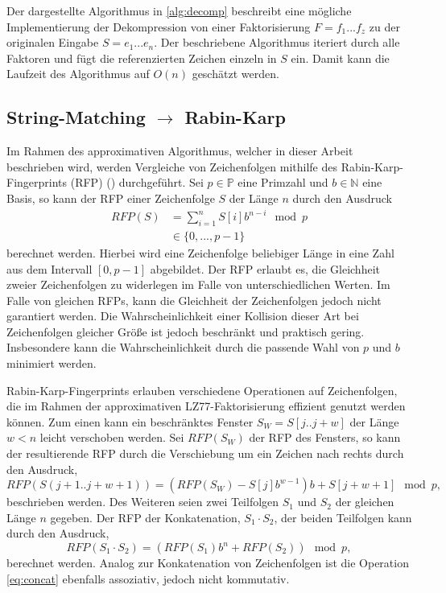 Der dargestellte Algorithmus in \ref{alg:decomp} beschreibt eine mögliche Implementierung der Dekompression von einer Faktorisierung $F=f_1...f_z$ zu der originalen Eingabe
$S=e_1...e_n$. Der beschriebene Algorithmus iteriert durch alle Faktoren und fügt die referenzierten Zeichen einzeln in $S$ ein. Damit kann die Laufzeit des 
Algorithmus auf $O(n)$ geschätzt werden.

\subsection{String-Matching $\rightarrow$ Rabin-Karp}
Im Rahmen des approximativen Algorithmus, welcher in dieser Arbeit beschrieben wird, werden Vergleiche von Zeichenfolgen mithilfe des Rabin-Karp-Fingerprints (RFP) (\cite{rfp})
durchgeführt. Sei
$p\in \mathbb{P}$ eine Primzahl und $b\in \mathbb{N}$ eine Basis, so kann der RFP einer Zeichenfolge $S$ der Länge $n$ durch den Ausdruck
\begin{equation}
    \begin{split}
    RFP(S) &= \sum_{i=1}^{n} S[i]b^{n-i} \mod p \\
    &\in \{0,...,p-1\}
    \end{split}
\end{equation}
berechnet werden. Hierbei wird eine Zeichenfolge beliebiger Länge in eine Zahl aus dem Intervall $[0,p-1]$ abgebildet. Der RFP erlaubt es, die Gleichheit zweier Zeichenfolgen zu widerlegen
im Falle von unterschiedlichen Werten. Im Falle von gleichen RFPs, kann die Gleichheit der Zeichenfolgen jedoch nicht garantiert werden. Die Wahrscheinlichkeit einer Kollision 
dieser Art bei Zeichenfolgen gleicher Größe ist jedoch beschränkt und praktisch gering. Insbesondere kann die Wahrscheinlichkeit durch die passende Wahl von $p$ und $b$ 
minimiert werden.

Rabin-Karp-Fingerprints erlauben verschiedene Operationen auf Zeichenfolgen, die im Rahmen der approximativen LZ77-Faktorisierung effizient genutzt werden können. Zum einen kann ein
beschränktes Fenster $S_{W} = S[j..j+w]$ der Länge $w<n$ leicht verschoben werden. Sei $RFP(S_{W})$ der RFP des Fensters, so kann der resultierende RFP durch die Verschiebung um 
ein Zeichen nach rechts durch den Ausdruck,
\begin{equation} \label{eq:shift}
    RFP(S(j+1..j+w+1)) = (RFP(S_W) - S[j]b^{w-1})b + S[j+w+1] \mod p,
\end{equation}
beschrieben werden. Des Weiteren seien zwei Teilfolgen $S_1$ und $S_2$ der gleichen Länge $n$ gegeben. Der RFP der Konkatenation, $S_1\cdot S_2$, der beiden Teilfolgen kann durch den Ausdruck,
\begin{equation} \label{eq:concat}
    RFP(S_1\cdot S_2) = (RFP(S_1)b^n + RFP(S_2)) \mod p,
\end{equation}
berechnet werden. Analog zur Konkatenation von Zeichenfolgen ist die Operation \ref{eq:concat} ebenfalls assoziativ, jedoch nicht kommutativ.

